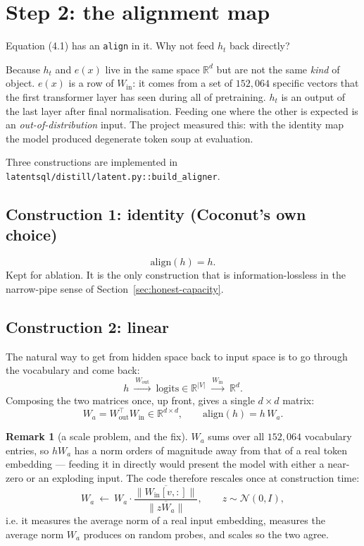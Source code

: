 \documentclass[11pt]{article}
\theoremstyle{definition}
\newtheorem{remark}[theorem]{Remark}
\begin{document}
\begin{center}
\end{center}

\section{Step 2: the alignment map}
\label{sec:align}

Equation (4.1) has an \texttt{align} in it. Why not feed $h_t$ back directly?

Because $h_t$ and $e(x)$ live in the same space $\mathbb{R}^d$ but are not the same \emph{kind} of object. $e(x)$ is a row of $W_{\mathrm{in}}$: it comes from a set of $152{,}064$ specific vectors that the first transformer layer has seen during all of pretraining. $h_t$ is an output of the last layer after final normalisation. Feeding one where the other is expected is an \emph{out-of-distribution} input. The project measured this: with the identity map the model produced degenerate token soup at evaluation.

Three constructions are implemented in \texttt{latentsql/distill/latent.py::build\_aligner}.

\subsection{Construction 1: identity (Coconut's own choice)}
\[
\mathrm{align}(h) = h.
\]
Kept for ablation. It is the only construction that is information-lossless in the narrow-pipe sense of Section~\ref{sec:honest-capacity}.

\subsection{Construction 2: linear}
The natural way to get from hidden space back to input space is to go through the vocabulary and come back:
\[
h \ \xrightarrow{\ W_{\mathrm{out}}\ }\ \text{logits} \in \mathbb{R}^{|V|}
\ \xrightarrow{\ W_{\mathrm{in}}\ }\ \mathbb{R}^{d}.
\]
Composing the two matrices once, up front, gives a single $d\times d$ matrix:
\[
W_a = W_{\mathrm{out}}^{\top}W_{\mathrm{in}} \in \mathbb{R}^{d\times d},
\qquad
\mathrm{align}(h) = h\,W_a.
\tag{4.2}
\]

\begin{remark}[a scale problem, and the fix]
$W_a$ sums over all $152{,}064$ vocabulary entries, so $hW_a$ has a norm orders of magnitude away from that of a real token embedding --- feeding it in directly would present the model with either a near-zero or an exploding input. The code therefore rescales once at construction time:
\[
W_a \ \leftarrow\ W_a \cdot
\frac{\overline{\|W_{\mathrm{in}}[v,:]\|}}
     {\overline{\|z W_a\|}},\qquad z\sim\mathcal{N}(0,I),
\]
i.e. it measures the average norm of a real input embedding, measures the average norm $W_a$ produces on random probes, and scales so the two agree.
\end{remark}
\end{document}
